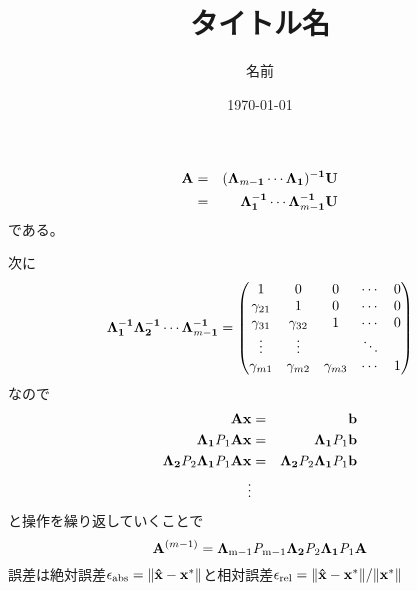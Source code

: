 \documentclass[uplatex]{jsarticle}
\title{タイトル名}
\author{名前}
\date{\today}
\begin{document}
    \maketitle
\begin{eqnarray*}
    \mathbf{A}&=&\mathbf{(\Lambda_{{\it m}-1}\cdots\Lambda_{1})^{-1}U} \\
    &=&\mathbf{\Lambda_{1}^{-1}\cdots\Lambda_{{\it m}-1}^{-1}}\mathbf{U}
\end{eqnarray*}
である。

次に
\begin{equation*}
    \mathbf{\Lambda_{1}^{-1}\Lambda_{2}^{-1}\cdots\Lambda_{{\it m}-1}^{-1}}=
    \begin{pmatrix}
    1  & 0 & 0 & \cdots & 0 \\
    \gamma_{21}  & 1 & 0 & \cdots & 0 \\
    \gamma_{31} & \gamma_{32} & 1 & \cdots & 0 \\
    \vdots & \vdots & & \ddots & \\
    \gamma_{m1} & \gamma_{m2} & \gamma_{m3} & \cdots & 1
    \end{pmatrix}
\end{equation*}
なので
\begin{eqnarray*}
    \mathbf{Ax}&=&\mathbf{b} \\
    \mathbf{\Lambda_{1}\mathrm{{\it P}_{1}}Ax}&=&\mathbf{\Lambda_{1}\mathrm{{\it P}_{1}}b} \\
    \mathbf{\Lambda_{2}\mathrm{{\it P}_{2}}\Lambda_{1}\mathrm{{\it P}_{1}}Ax}&=&\mathbf{\Lambda_{2}\mathrm{{\it P}_{2}}\Lambda_{1}\mathrm{{\it P}_{1}}b} \\
    \vdots
\end{eqnarray*}
と操作を繰り返していくことで
\begin{equation*}
    \mathbf{A}^{(m-1)}=\mathbf{\Lambda_{\mathrm{m-1}}\mathrm{{\it P}_{\mathrm{m-1}}}\Lambda_{2}\mathrm{{\it P}_{2}}\Lambda_{1}\mathrm{{\it P}_{1}}A}
\end{equation*}
誤差は絶対誤差$\epsilon_{\rm{abs}}=\|\mathbf{\hat{x}-x^*}\|$と相対誤差$\epsilon_{\rm{rel}}=\|\mathbf{\hat{x}-x^*}\|/\|\mathbf{x^*}\|$
\end{document}
